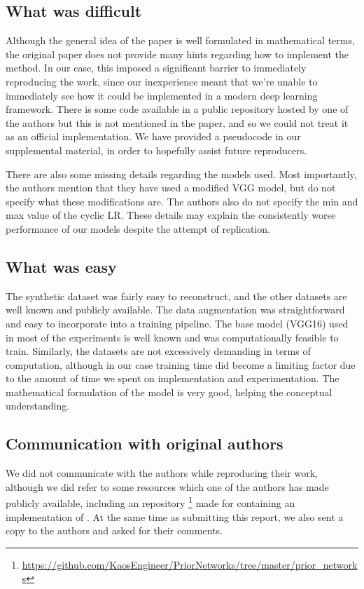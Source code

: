 \subsection{What was difficult}
Although the general idea of the paper is well formulated in mathematical terms, the original paper does not provide many hints regarding how to implement the method. In our case, this imposed a significant barrier to immediately reproducing the work, since our inexperience meant that we're unable to immediately see how it could be implemented in a modern deep learning framework. There is some code available in a public repository hosted by one of the authors but this is not mentioned in the paper, and so we could not treat it as an official implementation. We have provided a pseudocode in our supplemental material, in order to hopefully assist future reproducers. 

There are also some missing details regarding the models used. Most importantly, the authors mention that they have used a modified VGG model, but do not specify what these modifications are. The authors also do not specify the min and max value of the cyclic LR. These details may explain the consistently worse performance of our models despite the attempt of replication.

\subsection{What was easy}
The synthetic dataset was fairly easy to reconstruct, and the other datasets are well known and publicly available. The data augmentation was straightforward and easy to incorporate into a training pipeline. The base model (VGG16) used in most of the experiments is well known and was computationally feasible to train. Similarly, the datasets are not excessively demanding in terms of computation, although in our case training time did become a limiting factor due to the amount of time we spent on implementation and experimentation. The mathematical formulation of the model is very good, helping the conceptual understanding. 


\subsection{Communication with original authors}

We did not communicate with the authors while reproducing their work, although we did refer to some resources which one of the authors has made publicly available, including an repository \footnote{\url{https://github.com/KaosEngineer/PriorNetworks/tree/master/prior_networks}} made for \cite{NIPS2018_7936} containing an implementation of \EnDD. At the same time as submitting this report, we also sent a copy to the authors and asked for their comments. 



